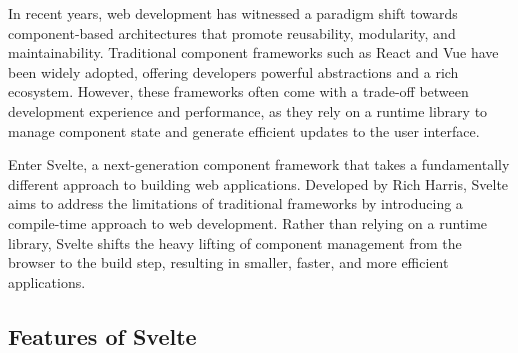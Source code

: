 




In recent years, web development has witnessed a paradigm shift towards component-based architectures that promote reusability, modularity, and maintainability. Traditional component frameworks such as React and Vue have been widely adopted, offering developers powerful abstractions and a rich ecosystem. However, these frameworks often come with a trade-off between development experience and performance, as they rely on a runtime library to manage component state and generate efficient updates to the user interface.

Enter Svelte, a next-generation component framework that takes a fundamentally different approach to building web applications. Developed by Rich Harris, Svelte aims to address the limitations of traditional frameworks by introducing a compile-time approach to web development. Rather than relying on a runtime library, Svelte shifts the heavy lifting of component management from the browser to the build step, resulting in smaller, faster, and more efficient applications.

\subsection{Features of Svelte}

